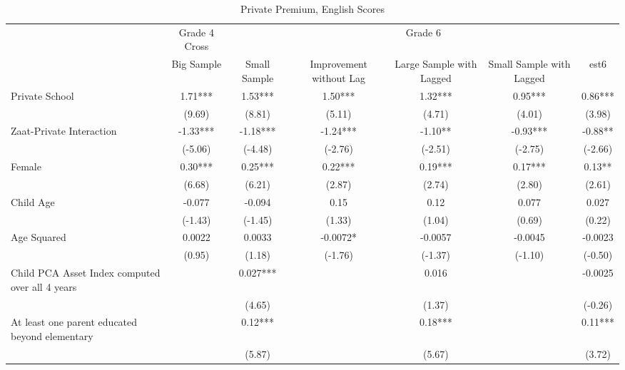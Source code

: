 \begin{sidewaystable}[htbp]\centering
\def\sym#1{\ifmmode^{#1}\else\(^{#1}\)\fi}
\caption{Private Premium, English Scores}
\begin{tabular}{l*{6}{c}}
\toprule
                &\multicolumn{1}{c}{Grade 4 Cross}&\multicolumn{5}{c}{Grade 6}                                     \\\cmidrule(lr){2-2}\cmidrule(lr){3-7}
                &\multicolumn{1}{c}{Big Sample}&\multicolumn{1}{c}{Small Sample}&\multicolumn{1}{c}{Improvement without Lag}&\multicolumn{1}{c}{Large Sample with Lagged}&\multicolumn{1}{c}{Small Sample with Lagged}&\multicolumn{1}{c}{est6}\\
\midrule
Private School  &     1.71***&     1.53***&     1.50***&     1.32***&     0.95***&     0.86***\\
                &   (9.69)   &   (8.81)   &   (5.11)   &   (4.71)   &   (4.01)   &   (3.98)   \\
Zaat-Private Interaction&    -1.33***&    -1.18***&    -1.24***&    -1.10** &    -0.93***&    -0.88** \\
                &  (-5.06)   &  (-4.48)   &  (-2.76)   &  (-2.51)   &  (-2.75)   &  (-2.66)   \\
Female          &     0.30***&     0.25***&     0.22***&     0.19***&     0.17***&     0.13** \\
                &   (6.68)   &   (6.21)   &   (2.87)   &   (2.74)   &   (2.80)   &   (2.61)   \\
Child Age       &   -0.077   &   -0.094   &     0.15   &     0.12   &    0.077   &    0.027   \\
                &  (-1.43)   &  (-1.45)   &   (1.33)   &   (1.04)   &   (0.69)   &   (0.22)   \\
Age Squared     &   0.0022   &   0.0033   &  -0.0072*  &  -0.0057   &  -0.0045   &  -0.0023   \\
                &   (0.95)   &   (1.18)   &  (-1.76)   &  (-1.37)   &  (-1.10)   &  (-0.50)   \\
Child PCA Asset Index computed over all 4 years&            &    0.027***&            &    0.016   &            &  -0.0025   \\
                &            &   (4.65)   &            &   (1.37)   &            &  (-0.26)   \\
At least one parent educated beyond elementary&            &     0.12***&            &     0.18***&            &     0.11***\\
                &            &   (5.87)   &            &   (5.67)   &            &   (3.72)   \\

\end{tabular}
\end{sidewaystable}
